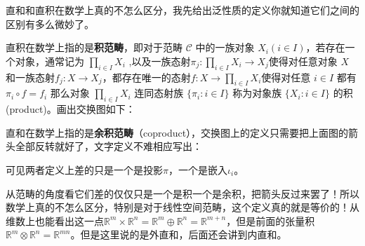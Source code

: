 直和和直积在数学上真的不怎么区分，我先给出泛性质的定义你就知道它们之间的区别有多么微妙了。
\begin{definition}
	直积在数学上指的是\textbf{积范畴}，即对于范畴 $\mathcal{C}$ 中的一族对象 $X_i\left(i\in I\right)$，若存在一个对象，通常记为 $\prod_{i\in I}X_i$ ,以及一族态射$\pi_j:\prod_{i\in I}X_i\to X_j$使得对任意对象 $X$ 和一族态射$f_j:X\to X_j$，都存在唯一的态射$f:X\to\prod_{i\in I}X_i$使得对任意 $i\in I$ 都有$	\pi_i\circ f=f_i$
	那么对象 $\prod_{i\in I}X_i$ 连同态射族 $\{\pi_i:i\in I\}$ 称为对象族 $\{X_i:i\in I\}$ 的积(product)。画出交换图如下：
	\begin{center}
	\end{center}
\end{definition}

\begin{definition}
	直和在数学上指的是\textbf{余积范畴}（coproduct），交换图上的定义只需要把上面图的箭头全部反转就好了，文字定义不难相应写出：
	\begin{center}
	\end{center}
	可见两者定义上差的只是一个是投影$\pi$，一个是嵌入$\iota_i$。
\end{definition}
从范畴的角度看它们差的仅仅只是一个是积一个是余积，把箭头反过来罢了！所以数学上真的不怎么区分，特别是对于线性空间范畴，这个定义真的就是等价的！从维数上也能看出这一点$\mathbb{R}^m\times\mathbb{R}^n=\mathbb{R}^m\oplus\mathbb{R}^n=\mathbb{R}^{m+n}$，但是前面的张量积$\mathbb{R}^{m}\otimes\mathbb{R}^{n}=\mathbb{R}^{mn}$。但是这里说的是外直和，后面还会讲到内直和。

